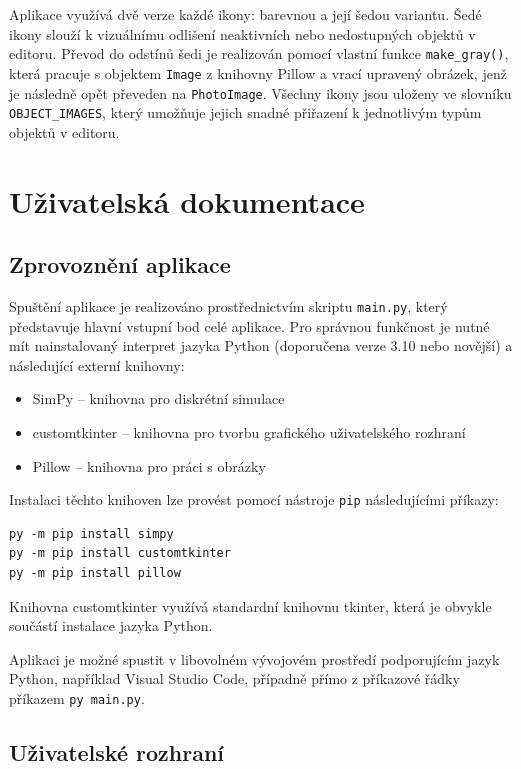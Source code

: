 \documentclass[
  program=itp,
  biblatex,
  figures=false,
  glossaries,
  index
]{kidiplom}
\begin{document}
Aplikace využívá dvě verze každé ikony: barevnou a její šedou variantu. Šedé ikony slouží k vizuálnímu odlišení neaktivních nebo nedostupných objektů v editoru. Převod do odstínů šedi je realizován pomocí vlastní funkce \texttt{make\_gray()}, která pracuje s objektem \texttt{Image} z knihovny Pillow a vrací upravený obrázek, jenž je následně opět převeden na \texttt{PhotoImage}. Všechny ikony jsou uloženy ve slovníku \texttt{OBJECT\_IMAGES}, který umožňuje jejich snadné přiřazení k jednotlivým typům objektů v editoru.

\section{Uživatelská dokumentace}

\subsection{Zprovoznění aplikace}

Spuštění aplikace je realizováno prostřednictvím skriptu \texttt{main.py}, který představuje hlavní vstupní bod celé aplikace. Pro správnou funkčnost je nutné mít nainstalovaný interpret jazyka Python (doporučena verze 3.10 nebo novější) a následující externí knihovny:

\begin{itemize}
    \item SimPy – knihovna pro diskrétní simulace
    \item customtkinter – knihovna pro tvorbu grafického uživatelského rozhraní
    \item Pillow – knihovna pro práci s obrázky
\end{itemize}

Instalaci těchto knihoven lze provést pomocí nástroje \texttt{pip} následujícími příkazy:

\begin{verbatim}
py -m pip install simpy
py -m pip install customtkinter
py -m pip install pillow
\end{verbatim}

Knihovna customtkinter využívá standardní knihovnu tkinter, která je obvykle součástí instalace jazyka Python.

Aplikaci je možné spustit v libovolném vývojovém prostředí podporujícím jazyk Python, například Visual Studio Code, případně přímo z příkazové řádky příkazem \texttt{py main.py}.

\subsection{Uživatelské rozhraní}
\end{document}
